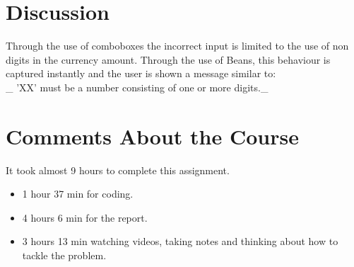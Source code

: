 \documentclass[a4paper]{scrartcl}
\begin{document}
\section{Discussion}
Through the use of comboboxes the incorrect input is limited to the use of non digits in the currency amount.
Through the use of Beans, this behaviour is captured instantly and the user is shown a message similar to:
\\_ 'XX' must be a number consisting of one or more digits._

\section{Comments About the Course}

It took almost 9 hours to complete this assignment.
\begin{itemize}
        \item 1 hour 37 min for coding.
        \item 4 hours 6 min for the report.
        \item 3 hours 13 min watching videos, taking notes and thinking about how to tackle the problem.
\end{itemize}
\end{document}
